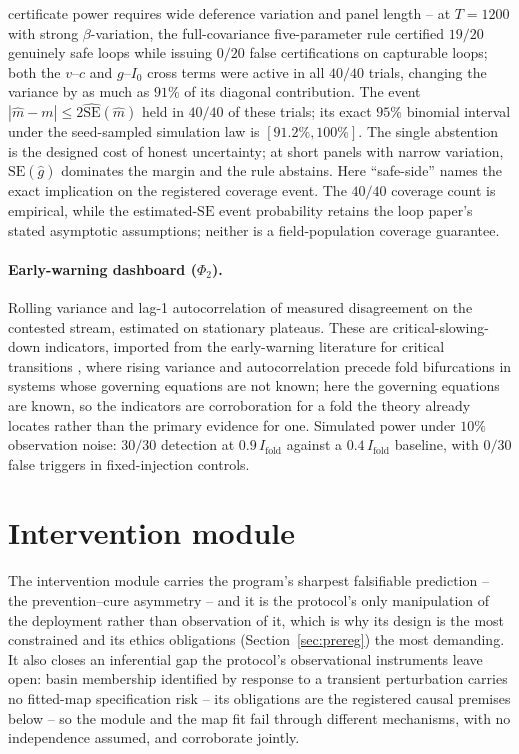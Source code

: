 \documentclass[11pt]{article}
\theoremstyle{definition}
\theoremstyle{remark}
\numberwithin{equation}{section}
\begin{document}
certificate power requires wide deference variation and panel length -- at $T = 1200$ with strong $\beta$-variation, the full-covariance five-parameter rule certified $19/20$ genuinely safe loops while issuing $0/20$ false certifications on capturable loops; both the $v$--$c$ and $g$--$I_0$ cross terms were active in all $40/40$ trials, changing the variance by as much as $91\%$ of its diagonal contribution. The event $|\hat m-m|\le2\widehat{\mathrm{SE}}(\hat m)$ held in $40/40$ of these trials; its exact $95\%$ binomial interval under the seed-sampled simulation law is $[91.2\%,100\%]$. The single abstention is the designed cost of honest uncertainty; at short panels with narrow variation, $\mathrm{SE}(\hat g)$ dominates the margin and the rule abstains. Here ``safe-side'' names the exact implication on the registered coverage event. The $40/40$ coverage count is empirical, while the estimated-$\mathrm{SE}$ event probability retains the loop paper's stated asymptotic assumptions; neither is a field-population coverage guarantee.

\paragraph{Early-warning dashboard ($\Phi_2$).} Rolling variance and lag-1 autocorrelation of measured disagreement on the contested stream, estimated on stationary plateaus. These are critical-slowing-down indicators, imported from the early-warning literature for critical transitions \citep{scheffer2009early, dakos2008slowing}, where rising variance and autocorrelation precede fold bifurcations in systems whose governing equations are not known; here the governing equations are known, so the indicators are corroboration for a fold the theory already locates rather than the primary evidence for one. Simulated power under $10\%$ observation noise: $30/30$ detection at $0.9\,I_{\mathrm{fold}}$ against a $0.4\,I_{\mathrm{fold}}$ baseline, with $0/30$ false triggers in fixed-injection controls.

\section{Intervention module}\label{sec:intervention}

The intervention module carries the program's sharpest falsifiable prediction -- the prevention--cure asymmetry -- and it is the protocol's only manipulation of the deployment rather than observation of it, which is why its design is the most constrained and its ethics obligations (Section~\ref{sec:prereg}) the most demanding. It also closes an inferential gap the protocol's observational instruments leave open: basin membership identified by response to a transient perturbation carries no fitted-map specification risk -- its obligations are the registered causal premises below -- so the module and the map fit fail through different mechanisms, with no independence assumed, and corroborate jointly.
\end{document}
